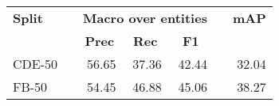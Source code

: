 \begin{tabular}{ l c r r r c r }
    \toprule

    \multicolumn{1}{l}{\textbf{Split}} & \phantom &
    \multicolumn{3}{c}{\textbf{Macro over entities}} & \phantom &
    \multicolumn{1}{c}{\textbf{mAP}} \\

    \cmidrule{3-5}

    \multicolumn{1}{c}{} &&
    \multicolumn{1}{c}{\textbf{Prec}} &
    \multicolumn{1}{c}{\textbf{Rec}} &
    \multicolumn{1}{c}{\textbf{F1}} &&
    \multicolumn{1}{c}{} \\

    \midrule

    CDE-50 && 56.65 & 37.36 & 42.44 && 32.04 \\
    FB-50  && 54.45 & 46.88 & 45.06 && 38.27 \\

    \bottomrule
\end{tabular}
